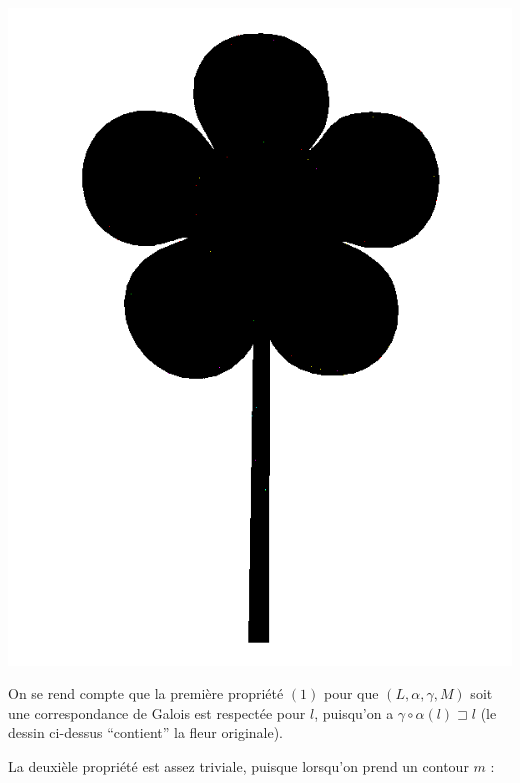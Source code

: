 \documentclass[french]{article}
\begin{document}
  \begin{center}
    \includegraphics[scale=0.19]{./pictures/flower3.png}
  \end{center}
  
  On se rend compte que la première propriété $(1)$ pour que $(L, \alpha, \gamma, M)$ soit une correspondance de Galois est respectée pour $l$, puisqu'on a $\gamma \circ \alpha (l) \sqsupset l$ (le dessin ci-dessus ``contient'' la fleur originale).
  
  La deuxièle propriété est assez triviale, puisque lorsqu'on prend un contour $m$ :
  
\end{document}
